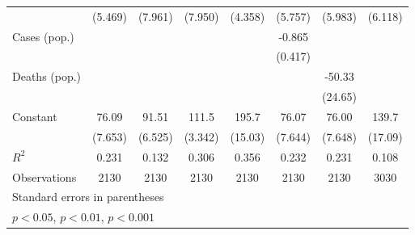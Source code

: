 \documentclass{article}
\begin{document}
{\begin{longtable}{l*{7}{c}}
                &  (5.469)         &  (7.961)         &  (7.950)         &  (4.358)         &  (5.757)         &  (5.983)         &  (6.118)         \\
Cases (pop.)    &                  &                  &                  &                  &   -0.865         &                  &                  \\
                &                  &                  &                  &                  &  (0.417)         &                  &                  \\
Deaths (pop.)   &                  &                  &                  &                  &                  &   -50.33         &                  \\
                &                  &                  &                  &                  &                  &  (24.65)         &                  \\
Constant        &    76.09\sym{***}&    91.51\sym{***}&    111.5\sym{***}&    195.7\sym{***}&    76.07\sym{***}&    76.00\sym{***}&    139.7\sym{***}\\
                &  (7.653)         &  (6.525)         &  (3.342)         &  (15.03)         &  (7.644)         &  (7.648)         &  (17.09)         \\
\hline
\(R^{2}\)       &    0.231         &    0.132         &    0.306         &    0.356         &    0.232         &    0.231         &    0.108         \\
Observations    &     2130         &     2130         &     2130         &     2130         &     2130         &     2130         &     3030         \\
\hline\hline
\multicolumn{8}{l}{\footnotesize Standard errors in parentheses}\\
\multicolumn{8}{l}{\footnotesize \sym{*} \(p<0.05\), \sym{**} \(p<0.01\), \sym{***} \(p<0.001\)}\\
\end{longtable}
}
\end{document}
